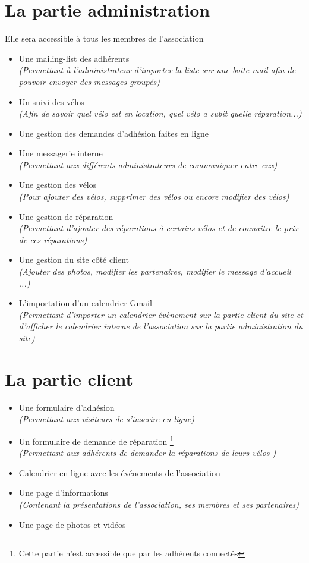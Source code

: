 \documentclass[11pt,a4paper,titlepage]{report}
\begin{document}
\section{La partie administration} 
Elle sera accessible à tous les membres de l'association \\
\begin{itemize}
\item Une mailing-list des adhérents \\
\textit{(Permettant à l'administrateur d'importer la liste sur une boite mail afin de pouvoir envoyer des messages groupés)}
\item Un suivi des vélos \\
\textit{(Afin de savoir quel vélo est en location, quel vélo a subit quelle réparation...)}
\item Une gestion des demandes d'adhésion faites en ligne
\item Une messagerie interne \\
\textit{(Permettant aux différents administrateurs de communiquer entre eux)}
\item Une gestion des vélos \\
\textit{(Pour ajouter des vélos, supprimer des vélos ou encore modifier des vélos)}
\item Une gestion de réparation \\
\textit{(Permettant d'ajouter des réparations à certains vélos et de connaître le prix de ces réparations)}
\item Une gestion du site côté client \\
\textit{(Ajouter des photos, modifier les partenaires, modifier le message d'accueil ...)}
\item L'importation d'un calendrier Gmail \\
\textit{(Permettant d'importer un calendrier évènement sur la partie client du site et d'afficher le calendrier interne de l'association sur la partie administration du site)}
\end{itemize}

  
  
\section{La partie client}

\begin{itemize}
\item Une formulaire d'adhésion \\
\textit{(Permettant aux visiteurs de s'inscrire en ligne)}
\item Un formulaire de demande de réparation \footnote{Cette partie n'est accessible que par les adhérents connectés}  \\
\textit{(Permettant aux adhérents de demander la réparations de leurs vélos )}
\item Calendrier en ligne avec les événements de l'association 
\item Une page d'informations  \\
\textit{(Contenant la présentations de l'association, ses membres et ses partenaires)} 
\item Une page de photos et vidéos  

\end{itemize}
\end{document}
